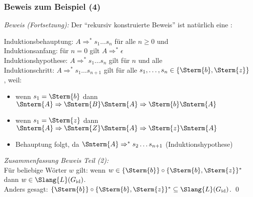 \documentclass[aspectratio=1610,onlymath]{beamer}
\begin{document}
\begin{frame}\frametitle{Beweis zum Beispiel (4)}

%
\bigskip

\emph{Beweis (Fortsetzung):} Der "`rekursiv konstruierte Beweis"' ist natürlich eine :
\medskip

\alert{Induktionsbehauptung:} $A\Rightarrow^* s_1\ldots s_n$ für alle $n\geq 0$ und \\
\alert{Induktionsanfang:} für $n=0$ gilt $A\Rightarrow^* \epsilon$\\
\alert{Induktionshypothese:} $A\Rightarrow^* s_1\ldots s_n$ gilt für $n$ und alle \\
\alert{Induktionschritt:} $A\Rightarrow^* s_1\ldots s_{n+1}$ gilt für alle $s_1,\ldots,s_n\in \{\Sterm{b},\Sterm{z}\}$, weil:\\
\begin{itemize}
\item wenn $s_1=\Sterm{b}$ dann $\Snterm{A}\Rightarrow \Snterm{B}\Snterm{A}\Rightarrow\Sterm{b}\Snterm{A}$
\item wenn $s_1=\Sterm{z}$ dann $\Snterm{A}\Rightarrow \Snterm{Z}\Snterm{A}\Rightarrow\Sterm{z}\Snterm{A}$
\item Behauptung folgt, da $\Snterm{A}\Rightarrow^* s_2\ldots s_{n+1}$ (Induktionshypothese)
\end{itemize}
\medskip\pause

\emph{Zusammenfassung Beweis Teil (2):}\\
Für beliebige Wörter $w$ gilt: wenn $w\in\{\Sterm{b}\}\circ \{\Sterm{b},\Sterm{z}\}^*$ dann $w\in\Slang{L}(G_{\text{id}})$.\\
Anders gesagt: $\{\Sterm{b}\}\circ \{\Sterm{b},\Sterm{z}\}^*\subseteq \Slang{L}(G_{\text{id}})$.
\qed

\end{frame}


\end{document}
